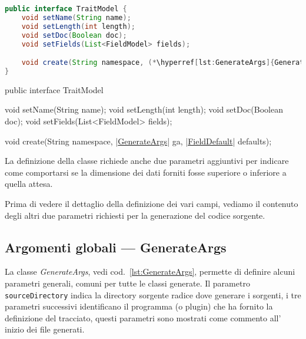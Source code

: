 \ifesource
\begin{figure*}[!htb]
\begin{lstlisting}[language=java, caption=interfaccia TraitModel, 
label=lst:TraitModel]
public interface TraitModel {
    void setName(String name);
    void setLength(int length);
    void setDoc(Boolean doc);
    void setFields(List<FieldModel> fields);

    void create(String namespace, (*\hyperref[lst:GenerateArgs]{GenerateArgs}*) ga, (*\hyperref[lst:FieldDefault]{FieldDefault}*) defaults);
}
\end{lstlisting}
\end{figure*}
\else
\begin{elisting}[!htb]
\begin{javacode}
public interface TraitModel {
    void setName(String name);
    void setLength(int length);
    void setDoc(Boolean doc);
    void setFields(List<FieldModel> fields);

    void create(String namespace, |\hyperref[lst:GenerateArgs]{GenerateArgs}| ga, |\hyperref[lst:FieldDefault]{FieldDefault}| defaults);
}
\end{javacode}
\caption{interfaccia TraitModel}
\label{lst:TraitModel}
\end{elisting}
\fi
La definizione della classe richiede anche due parametri aggiuntivi per indicare
come comportarsi se la dimensione dei dati forniti fosse superiore o inferiore a
quella attesa.

Prima di vedere il dettaglio della definizione dei vari campi, vediamo il 
contenuto degli altri due parametri richiesti per la generazione del codice
sorgente.

\subsection{Argomenti globali --- GenerateArgs}
La classe \textsl{GenerateArgs}, vedi cod.~\ref{lst:GenerateArgs}, permette di
definire alcuni parametri generali, comuni per tutte le classi generate.
Il parametro \texttt{sourceDirectory} indica la directory sorgente radice dove 
generare i sorgenti, i tre parametri successivi identificano il programma 
(o plugin) che ha fornito la definizione del tracciato, questi parametri sono 
mostrati come commento all'\,inizio dei file generati.

